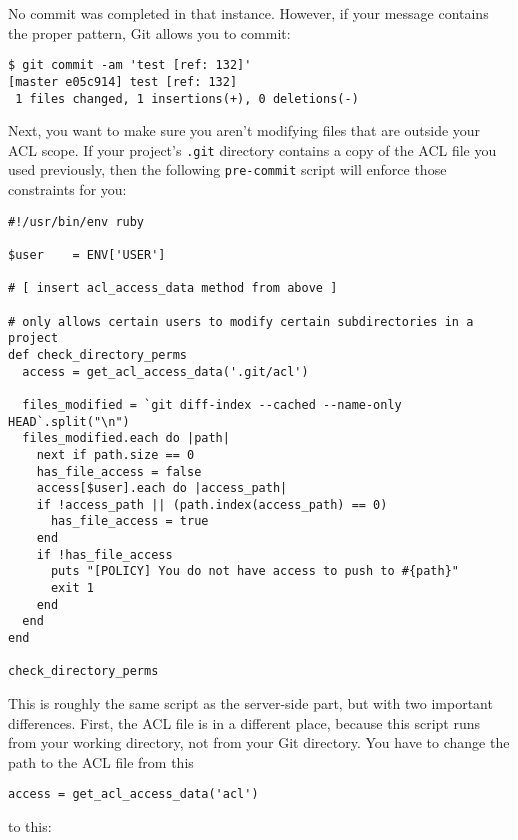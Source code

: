 \documentclass[a4paper]{book}
\begin{document}
No commit was completed in that instance. However, if your message contains the proper pattern, Git allows you to commit:

\begin{shaded}\begin{verbatim}
$ git commit -am 'test [ref: 132]'
[master e05c914] test [ref: 132]
 1 files changed, 1 insertions(+), 0 deletions(-)
\end{verbatim}\end{shaded}

Next, you want to make sure you aren't modifying files that are outside your ACL scope. If your project's \texttt{.git} directory contains a copy of the ACL file you used previously, then the following \texttt{pre-commit} script will enforce those constraints for you:

\begin{shaded}\begin{verbatim}
#!/usr/bin/env ruby

$user    = ENV['USER']

# [ insert acl_access_data method from above ]

# only allows certain users to modify certain subdirectories in a project
def check_directory_perms
  access = get_acl_access_data('.git/acl')

  files_modified = `git diff-index --cached --name-only HEAD`.split("\n")
  files_modified.each do |path|
    next if path.size == 0
    has_file_access = false
    access[$user].each do |access_path|
    if !access_path || (path.index(access_path) == 0)
      has_file_access = true
    end
    if !has_file_access
      puts "[POLICY] You do not have access to push to #{path}"
      exit 1
    end
  end
end

check_directory_perms
\end{verbatim}\end{shaded}

This is roughly the same script as the server-side part, but with two important differences. First, the ACL file is in a different place, because this script runs from your working directory, not from your Git directory. You have to change the path to the ACL file from this

\begin{shaded}\begin{verbatim}
access = get_acl_access_data('acl')
\end{verbatim}\end{shaded}

to this:
\end{document}
